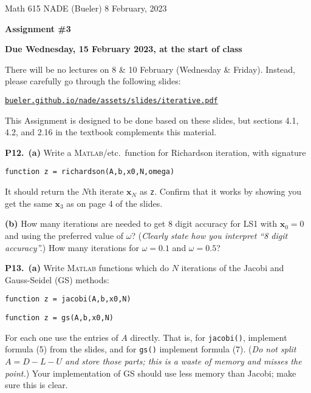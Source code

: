 \documentclass[12pt]{amsart}
\newcommand{\bx}{\mathbf{x}}
\newcommand{\prob}[1]{\bigskip\noindent\textbf{#1.}\quad }
\newcommand{\epart}[1]{\medskip\noindent\textbf{(#1)}\quad }
\newcommand{\ppart}[1]{\,\textbf{(#1)}\quad }
\newcommand{\Matlab}{\textsc{Matlab}\xspace}
\begin{document}
\scriptsize \noindent Math 615 NADE (Bueler) \hfill 8 February, 2023
\normalsize

\medskip\bigskip

\Large\centerline{\textbf{Assignment \#3}}
\large
\bigskip

\centerline{\textbf{Due Wednesday, 15 February 2023, at the start of class}}
\bigskip
\normalsize

\thispagestyle{empty}

\bigskip
There will be no lectures on 8 \& 10 February (Wednesday \& Friday).  Instead, please carefully go through the following slides:

\medskip
\centerline{\href{http://bueler.github.io/nade/assets/slides/iterative.pdf}{\texttt{bueler.github.io/nade/assets/slides/iterative.pdf}}}

\medskip
\noindent  This Assignment is designed to be done based on these slides, but sections 4.1, 4.2, and 2.16 in the textbook complements this material.

\medskip

\prob{P12}  \ppart{a} Write a \Matlab/etc.~function for Richardson iteration, with signature

\bigskip
\centerline{\texttt{function z = richardson(A,b,x0,N,omega)}}

\bigskip
\noindent It should return the $N$th iterate $\bx_N$ as \texttt{z}.  Confirm that it works by showing you get the same $\bx_3$ as on page 4 of the slides.

\epart{b}  How many iterations are needed to get 8 digit accuracy for LS1 with $\bx_0=0$ and using the preferred value of $\omega$?  (\emph{Clearly state how you interpret ``8 digit accuracy''.})  How many iterations for $\omega = 0.1$ and $\omega = 0.5$?


\prob{P13}  \ppart{a}  Write \Matlab functions which do $N$ iterations of the Jacobi and Gauss-Seidel (GS) methods:

\medskip
\centerline{\texttt{function z = jacobi(A,b,x0,N)}}

\centerline{\texttt{function z = gs(A,b,x0,N)}}

\medskip
\noindent For each one use the entries of $A$ directly.  That is, for \texttt{jacobi()}, implement formula (5) from the slides, and for \texttt{gs()} implement formula (7).  (\emph{Do not split $A=D-L-U$ and store those parts; this is a waste of memory and misses the point.})  Your implementation of GS should use less memory than Jacobi; make sure this is clear. 
\end{document}
